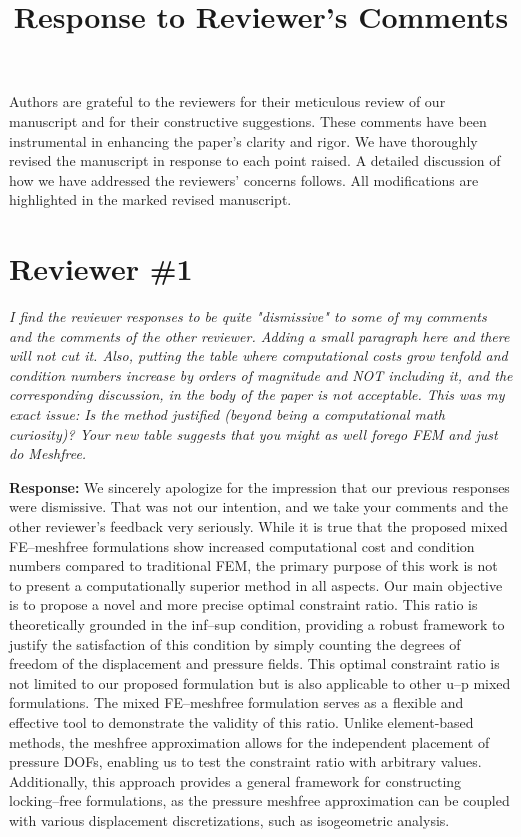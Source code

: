 \documentclass{article}
\title{Response to Reviewer's Comments}
\author{}
\date{}
\begin{document}
\maketitle
Authors are grateful to the reviewers for their meticulous review of our manuscript and for their constructive suggestions.
These comments have been instrumental in enhancing the paper's clarity and rigor.
We have thoroughly revised the manuscript in response to each point raised.
A detailed discussion of how we have addressed the reviewers' concerns follows.
All modifications are highlighted in the marked revised manuscript.

\section*{Reviewer \#1}
\textit{I find the reviewer responses to be quite "dismissive" to some of my comments and the comments of the other reviewer. Adding a small paragraph here and there will not cut it. Also, putting the table where computational costs grow tenfold and condition numbers increase by orders of magnitude and NOT including it, and the corresponding discussion, in the body of the paper is not acceptable. This was my exact issue: Is the method justified (beyond being a computational math curiosity)? Your new table suggests that you might as well forego FEM and just do Meshfree.}

\textbf{Response:} 
We sincerely apologize for the impression that our previous responses were dismissive.
That was not our intention, and we take your comments and the other reviewer's feedback very seriously.
While it is true that the proposed mixed FE--meshfree formulations show increased computational cost and condition numbers compared to traditional FEM, the primary purpose of this work is not to present a computationally superior method in all aspects.
Our main objective is to propose a novel and more precise optimal constraint ratio.
This ratio is theoretically grounded in the inf--sup condition, providing a robust framework to justify the satisfaction of this condition by simply counting the degrees of freedom of the displacement and pressure fields.
This optimal constraint ratio is not limited to our proposed formulation but is also applicable to other u--p mixed formulations.
The mixed FE--meshfree formulation serves as a flexible and effective tool to demonstrate the validity of this ratio.
Unlike element-based methods, the meshfree approximation allows for the independent placement of pressure DOFs, enabling us to test the constraint ratio with arbitrary values.
Additionally, this approach provides a general framework for constructing locking--free formulations, as the pressure meshfree approximation can be coupled with various displacement discretizations, such as isogeometric analysis.
\end{document}
